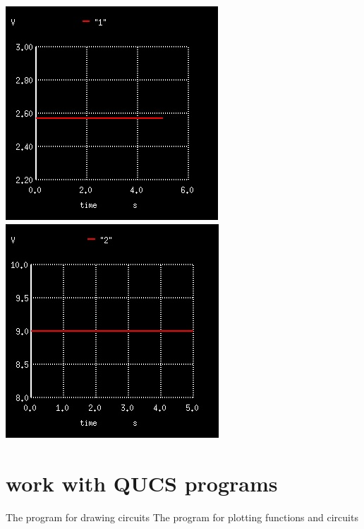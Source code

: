 \documentclass{report}
\begin{document}
\begin{center}
    \includegraphics[scale=0.4]{1.jpg}
    \includegraphics[scale=0.4]{2.jpg}
\end{center}

\section{work with QUCS programs}


\begin{thebibliography}{9}
The program for drawing circuits
The program for plotting functions and circuits
\end{thebibliography}
\end{document}
